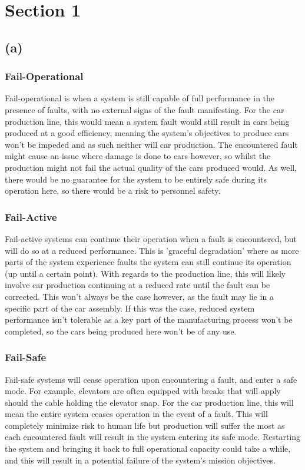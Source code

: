 \documentclass[]{report}
\begin{document}
		\section{Section 1}
			\subsection{(a)}
				\subsubsection{Fail-Operational}
				Fail-operational is when a system is still capable of full performance in the presence of faults, with no external signs of the fault manifesting. For the car production line, this would mean a system fault would still result in cars being produced at a good efficiency, meaning the system's objectives to produce cars won't be impeded and as such neither will car production. The encountered fault might cause an issue where damage is done to cars however, so whilst the production might not fail the actual quality of the cars produced would. As well, there would be no guarantee for the system to be entirely safe during its operation here, so there would be a risk to personnel safety.
				
				\subsubsection{Fail-Active}
				Fail-active systems can continue their operation when a fault is encountered, but will do so at a reduced performance. This is 'graceful degradation' where as more parts of the system experience faults the system can still continue its operation (up until a certain point). With regards to the production line, this will likely involve car production continuing at a reduced rate until the fault can be corrected. This won't always be the case however, as the fault may lie in a specific part of the car assembly. If this was the case, reduced system performance isn't tolerable as a key part of the manufacturing process won't be completed, so the cars being produced here won't be of any use.
				
				\subsubsection{Fail-Safe}
				Fail-safe systems will cease operation upon encountering a fault, and enter a safe mode. For example, elevators are often equipped with breaks that will apply should the cable holding the elevator snap. For the car production line, this will mean the entire system ceases operation in the event of a fault. This will completely minimize risk to human life but production will suffer the most as each encountered fault will result in the system entering its safe mode. Restarting the system and bringing it back to full operational capacity could take a while, and this will result in a potential failure of the system's mission objectives.
				
\end{document}
